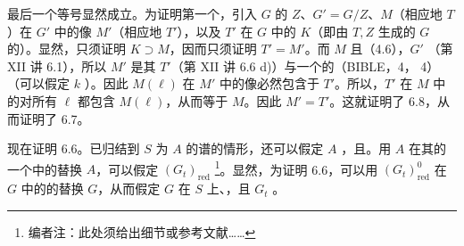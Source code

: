 最后一个等号显然成立。为证明第一个，引入 $G$ 的 $Z$、$G'=G/Z$、$M$（相应地 $T$）在 $G'$ 中的像 $M'$（相应地 $T'$），以及 $T'$ 在 $G$ 中的 $K$（即由 $T,Z$ 生成的 $G$ 的）。显然，只须证明 $K\supset M$，因而只须证明 $T'=M'$。而 $M$ 且（4.6），$G'$ （第 XII 讲 6.1），所以 $M'$ 是其 $T'$（第 XII 讲 6.6 d)）与一个的（BIBLE，4， 4）（可以假定 $k$ ）。因此 $M(\ell)$ 在 $M'$ 中的像必然包含于 $T'$。所以，$T'$ 在 $M$ 中的对所有 $\ell$ 都包含 $M(\ell)$，从而等于 $M$。因此 $M'=T'$。这就证明了 6.8，从而证明了 6.7。

现在证明 6.6。已归结到 $S$ 为 $A$ 的谱的情形，还可以假定 $A$ ，且。用 $A$ 在其的一个中的替换 $A$，可以假定 $(G_t)_{\mathrm{red}}$ \footnote{编者注：此处须给出细节或参考文献……}。显然，为证明 6.6，可以用 $(G_t)_{\mathrm{red}}^0$ 在 $G$ 中的的替换 $G$，从而假定 $G$ 在 $S$ 上、，且 $G_t$ 。

